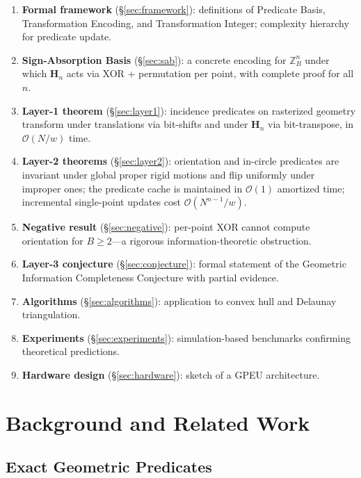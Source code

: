 \documentclass[11pt,letterpaper]{article}
\newcommand{\ZBd}[1]{\mathbb{Z}_B^{#1}}
\newcommand{\Hn}{\mathbf{H}_n}
\newcommand{\cO}{\mathcal{O}}
\newcommand{\wt}{w}       %
\begin{document}
\begin{enumerate}[leftmargin=2em]
\item \textbf{Formal framework} (\S\ref{sec:framework}): definitions of Predicate Basis,
  Transformation Encoding, and Transformation Integer; complexity hierarchy for
  predicate update.
\item \textbf{Sign-Absorption Basis} (\S\ref{sec:sab}): a concrete encoding for
  $\ZBd{n}$ under which $\Hn$ acts via XOR + permutation per point, with complete
  proof for all $n$.
\item \textbf{Layer-1 theorem} (\S\ref{sec:layer1}): incidence predicates on rasterized
  geometry transform under translations via bit-shifts and under $\Hn$ via bit-transpose,
  in $\cO(N/\wt)$ time.
\item \textbf{Layer-2 theorems} (\S\ref{sec:layer2}): orientation and in-circle
  predicates are invariant under global proper rigid motions and flip uniformly under
  improper ones; the predicate cache is maintained in $\cO(1)$ amortized time; incremental
  single-point updates cost $\cO(N^{n-1}/\wt)$.
\item \textbf{Negative result} (\S\ref{sec:negative}): per-point XOR cannot compute
  orientation for $B\ge 2$---a rigorous information-theoretic obstruction.
\item \textbf{Layer-3 conjecture} (\S\ref{sec:conjecture}): formal statement of the
  Geometric Information Completeness Conjecture with partial evidence.
\item \textbf{Algorithms} (\S\ref{sec:algorithms}): application to convex hull and
  Delaunay triangulation.
\item \textbf{Experiments} (\S\ref{sec:experiments}): simulation-based benchmarks
  confirming theoretical predictions.
\item \textbf{Hardware design} (\S\ref{sec:hardware}): sketch of a GPEU architecture.
\end{enumerate}

\section{Background and Related Work}\label{sec:background}

\subsection{Exact Geometric Predicates}
\end{document}
